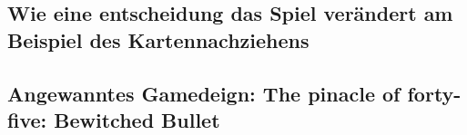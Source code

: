 
%


\subsection{Wie eine entscheidung das Spiel verändert am Beispiel des Kartennachziehens}\label{subsec:placementMatters}




\subsection{Angewanntes Gamedeign: The pinacle of forty-five: Bewitched Bullet}\label{subsec:placementMatters}


\renewcommand{\kapitelautor}{}
